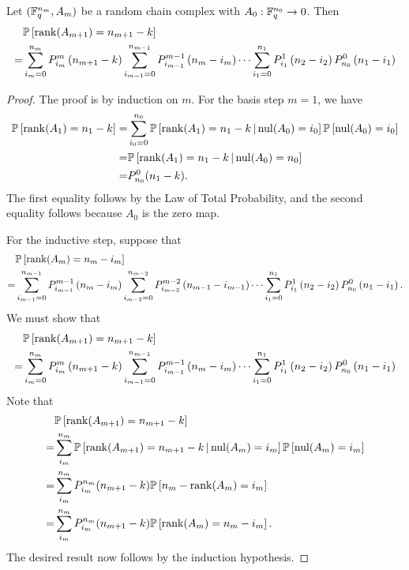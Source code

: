 \begin{lemma}\label{lemProbranks}
Let $(\mathbb{F}_q^{n_m}, A_m)$ be a random chain complex with $A_0:\mathbb{F}_q^{n_0}\to 0$.  Then
\begin{align*}
 &  \mathbb{P}\left[\operatorname{\mathrm{rank}}(A_{m+1}) = n_{m+1} - k\right]\\
=& 	\sum_{i_m=0}^{n_m} P_{i_m}^{m}\left(n_{m+1} -k\right)
	\sum_{i_{m-1}=0}^{n_{m-1}} P_{i_{m-1}}^{m-1}\left(n_m - i_m\right)
		\cdots
	\sum_{i_1 = 0}^{n_1} P_{i_1}^1\left(n_2 - i_2\right) P_{n_0}^0 \left(n_1 - i_1\right) 
\end{align*}
\end{lemma}
\begin{proof}
The proof is by induction on $m$. For the basis step $m=1$, we have
\begin{align*}
\mathbb{P}\left[\operatorname{\mathrm{rank}}(A_1) = n_1 - k\right]
	=& \sum_{i_0=0}^{n_0}\mathbb{P}\left [\operatorname{\mathrm{rank}}(A_1)= n_1 - k\,|\,\mathrm{nul} (A_0) = i_0\right]
		\mathbb{P}\left[\mathrm{nul}(A_0) = i_0 \right]\\
	=& \mathbb{P}\left [\operatorname{\mathrm{rank}}(A_1)= n_1 - k\,|\,\mathrm{nul} (A_0) = n_0\right]\\
	=& P_{n_0}^0(n_1 - k).
\end{align*}
The first equality follows by the Law of Total Probability, and the second equality follows because $A_0$ is the zero map.

For the inductive step, suppose that
\begin{align*}
 &  \mathbb{P}\left[\operatorname{\mathrm{rank}}(A_{m}) = n_{m} - i_{m}\right]\\
=& 	\sum_{i_{m-1}=0}^{n_{m-1}} P_{i_{m-1}}^{m-1}\left(n_{m} -i_{m}\right)
	\sum_{i_{m-2}=0}^{n_{m-2}} P_{i_{m-2}}^{m-2}\left(n_{m-1} - i_{m-1}\right)
		\cdots
	\sum_{i_1 = 0}^{n_1} P_{i_1}^1\left(n_2 - i_2\right) P_{n_0}^0 \left(n_1 - i_1\right).
\end{align*}
We must show that
\begin{align*}
 &  \mathbb{P}\left[\operatorname{\mathrm{rank}}(A_{m+1}) = n_{m+1} - k\right]\\
=& 	\sum_{i_m=0}^{n_m} P_{i_m}^{m}\left(n_{m+1} -k\right)
	\sum_{i_{m-1}=0}^{n_{m-1}} P_{i_{m-1}}^{m-1}\left(n_m - i_m\right)
		\cdots
	\sum_{i_1 = 0}^{n_1} P_{i_1}^1\left(n_2 - i_2\right) P_{n_0}^0 \left(n_1 - i_1\right) 
\end{align*}
Note that
\begin{align*}
 &	\mathbb{P}\left[\operatorname{\mathrm{rank}}(A_{m+1}) = n_{m+1} - k\right]\\
=& 	\sum_{i_{m}}^{n_{m}} \mathbb{P}\left[ \operatorname{\mathrm{rank}}(A_{m+1}) = n_{m+1} - k  
\,|\, \mathrm{nul}(A_m) = i_m\right] \mathbb{P}\left[\mathrm{nul}(A_m) = i_m\right]\\
=&  \sum_{i_{m}}^{n_{m}} P_{i_m}^{n_m}(n_{m+1} - k)
		\mathbb{P}\left[n_m - \operatorname{\mathrm{rank}}(A_m) = i_m\right]\\
=&	\sum_{i_{m}}^{n_{m}} P_{i_m}^{n_m}(n_{m+1} - k)
		\mathbb{P}\left[\operatorname{\mathrm{rank}}(A_m) = n_m- i_m\right].
\end{align*}
The desired result now follows by the induction hypothesis.
\end{proof}

